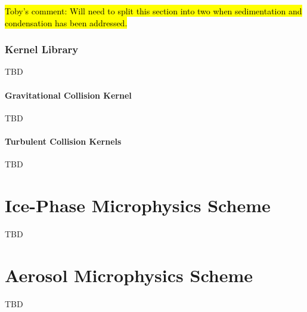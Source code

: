 \documentclass{report}
\begin{document}
\hl{Toby's comment: Will need to split this section into two when sedimentation and condensation has been addressed.}

\subsection{Kernel Library}
TBD

\subsubsection{Gravitational Collision Kernel}
TBD

\subsubsection{Turbulent Collision Kernels}
TBD

\chapter{Ice-Phase Microphysics Scheme}
TBD

\chapter{Aerosol Microphysics Scheme}
TBD




\end{document}
